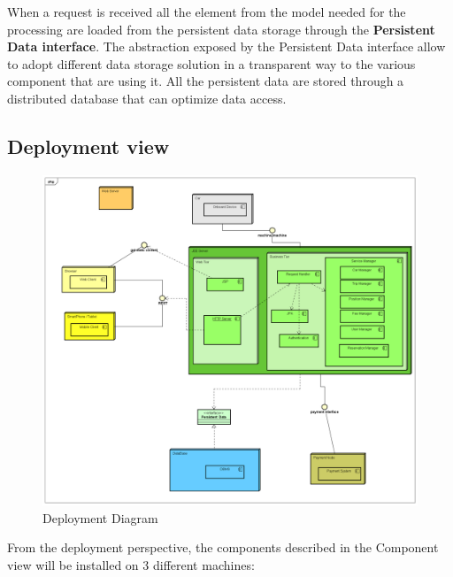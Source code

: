 When a request is received all the element from the model needed for the processing are loaded from the persistent data storage through the \textbf{Persistent Data interface}. The abstraction exposed by the Persistent Data interface allow to adopt different data storage solution in a transparent way to the various component that are using it. All the persistent data are stored through a distributed database that can optimize data access.

\newpage

\subsection{Deployment view}\label{deployment}
 	
\begin{figure}[H]	
	\centering
	\includegraphics[width=\textwidth]{img/deployment_diagram}
	\caption{Deployment Diagram}
\end{figure}

From the deployment perspective, the components described in the Component view will be installed on 3 different machines:

